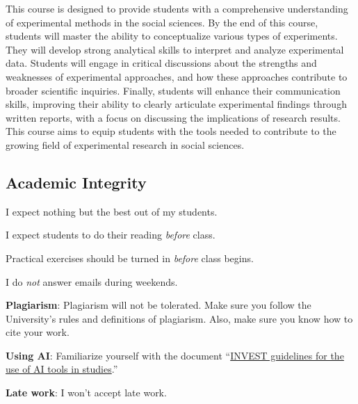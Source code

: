\documentclass[letterpaper]{article}
\renewenvironment{itemize}{
  \begin{list}{}{
    \setlength{\leftmargin}{1.5em}
  }
}{
  \end{list}
}
\begin{document}
This course is designed to provide students with a comprehensive understanding of experimental methods in the social sciences. By the end of this course, students will master the ability to conceptualize various types of experiments. They will develop strong analytical skills to interpret and analyze experimental data. Students will engage in critical discussions about the strengths and weaknesses of experimental approaches, and how these approaches contribute to broader scientific inquiries. Finally, students will enhance their communication skills, improving their ability to clearly articulate experimental findings through written reports, with a focus on discussing the implications of research results. This course aims to equip students with the tools needed to contribute to the growing field of experimental research in social sciences.



\subsection*{Academic Integrity}

I expect nothing but the best out of my students. 

\begin{itemize}
     \item[$\circ$] I expect students to do their reading \emph{before} class.
     \item[$\circ$] Practical exercises should be turned in \emph{before} class begins. 

  \item[$\circ$] I do \emph{not} answer emails during weekends. 
\end{itemize}


\begin{itemize}
  \item[{\color{red}\Pointinghand}] {\bf Plagiarism}: Plagiarism will not be tolerated. Make sure you follow the University's rules and definitions of plagiarism. Also, make sure you know how to cite your work. 

  \item[{\color{red}\Pointinghand}] {\bf Using AI}: Familiarize yourself with the document ``\href{https://github.com/hbahamonde/Exp_Soc_Science/raw/main/AI_Guidelines_2024.pdf}{INVEST guidelines for the use of AI tools in studies}.'' 

  \item[{\color{red}\Pointinghand}] {\bf Late work}: I won't accept late work.

\end{itemize}
\end{document}
